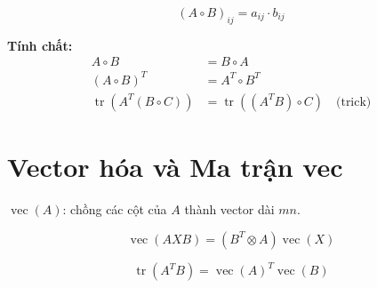 \[
(A \circ B)_{ij} = a_{ij} \cdot b_{ij}
\]

\textbf{Tính chất:}
\begin{align}
A \circ B &= B \circ A \\
(A \circ B)^T &= A^T \circ B^T \\
\operatorname{tr}(A^T(B \circ C)) &= \operatorname{tr}((A^TB) \circ C) \quad \text{(trick)}
\end{align}

\section{Vector hóa và Ma trận vec}

$\operatorname{vec}(A)$: chồng các cột của $A$ thành vector dài $mn$.

\[
\operatorname{vec}(AXB) = (B^T \otimes A) \operatorname{vec}(X)
\]

\[
\operatorname{tr}(A^TB) = \operatorname{vec}(A)^T \operatorname{vec}(B)
\]

